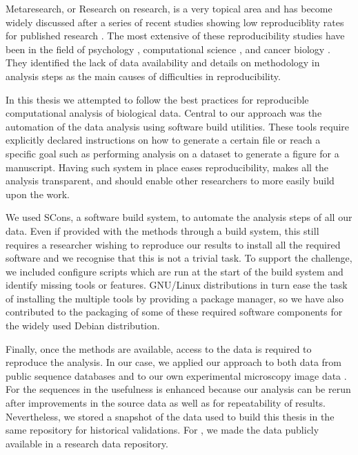 
Metaresearch, or Research on research,
is a very topical area and has become widely
discussed after a series of recent
studies showing low reproduciblity rates for
published research \citep{ioannidis2015meta}.  The
most extensive of these reproducibility studies have been in the field of
psychology \citep{open2015estimating},
computational science \citep{collberg2016repeatability},
and cancer biology \citep{prinz2011believe, ioannidis2009repeatability}.
They identified the lack of data availability
and details on methodology in analysis steps as
the main causes of difficulties in reproducibility.

In this thesis we attempted to follow the best practices for
reproducible computational analysis of biological data.
Central to our approach was the automation of the data analysis using
software build utilities.  These tools require explicitly declared
instructions on how to generate a certain file or reach a specific
goal such as performing analysis on a dataset to generate a
figure for a manuscript.  Having such system in place eases
reproducibility, makes all the analysis transparent, and should enable
other researchers to more easily build upon the work.

We used SCons, a software build system, to automate the analysis
steps of all our data.
Even if provided with the methods through a build system,
this still requires a researcher wishing to reproduce
our results to install all the required software and we recognise that
this is not a
trivial task.  To support the challenge, we included
configure scripts which are run at the start of the build system and
identify missing tools or features.
GNU/Linux distributions in turn ease
the task of installing the multiple tools by providing a
package manager, so we have also contributed to the packaging of
some of these required software components for the
widely used Debian distribution.

Finally, once the methods are available, access to the
data is required to reproduce the analysis.  In our case, we applied
our approach to both data from public sequence
databases  and to our own experimental
microscopy image data .  For
the sequences in  the usefulness is
enhanced because our analysis can be rerun after improvements in the
source data as well as for repeatability of results.  Nevertheless, we stored a
snapshot of the data used to build this thesis in the same repository
for historical validations.
For , we made the
data publicly available in a research data repository.

